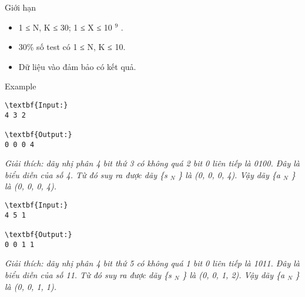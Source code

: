 Giới hạn
\begin{itemize}
	\item     1 ≤ N, K ≤ 30; 1 ≤ X ≤ 10    $^     9    $    .   
	\item     30\% số test có 1 ≤ N, K ≤ 10.   
	\item     Dữ liệu vào đảm bảo có kết quả.   
\end{itemize}
Example
\begin{verbatim}
\textbf{Input:}
4 3 2

\textbf{Output:}
0 0 0 4\end{verbatim}

\emph{    Giải thích: dãy nhị phân 4 bit thứ 3 có không quá 2 bit 0 liên tiếp là 0100. Đây là biểu diễn của số 4. Từ đó suy ra được dãy \{s    $_     N    $    \} là (0, 0, 0, 4). Vậy dãy \{a    $_     N    $    \} là (0, 0, 0, 4).   }
\begin{verbatim}
\textbf{Input:}
4 5 1

\textbf{Output:}
0 0 1 1\end{verbatim}

\emph{    Giải thích: dãy nhị phân 4 bit thứ 5 có không  quá 1 bit 0 liên tiếp là 1011. Đây là biểu diễn của số 11. Từ đó suy ra  được dãy \{s    $_     N    $    \} là (0, 0, 1, 2). Vậy dãy \{a    $_     N    $    \} là (0, 0, 1, 1).   }